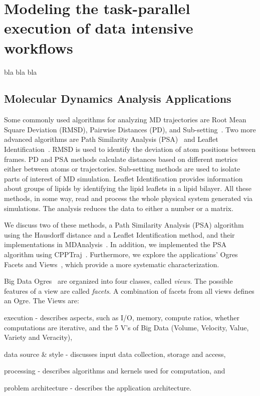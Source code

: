 \section{Modeling the task-parallel execution of data intensive workflows}
\label{task-par}
bla bla bla
\subsection{Molecular Dynamics Analysis Applications}
\label{use_cases}
Some commonly used algorithms for analyzing MD trajectories are Root Mean Square Deviation (RMSD), Pairwise Distances (PD), and Sub-setting~\cite{mura2014biomolecules}.
Two more advanced algorithms are Path Similarity Analysis (PSA)~\cite{seyler2015path} and Leaflet Identification~\cite{michaud2011mdanalysis}.
RMSD is used to identify the deviation of atom positions between frames.
PD and PSA methods calculate distances based on different metrics either between atoms or trajectories.
Sub-setting methods are used to isolate parts of interest of MD simulation.
Leaflet Identification provides information about groups of lipids by identifying the lipid leaflets in a lipid bilayer.
All these methods, in some way, read and process the whole physical system generated via simulations.
The analysis reduces the data to either a number or a matrix.

We discuss two of these methods, a Path Similarity Analysis (PSA) algorithm using the Hausdorff distance and a Leaflet Identification method, and their implementations in MDAnalysis~\cite{michaud2011mdanalysis,gowers2016mdanalysis}.
In addition, we implemented the PSA algorithm using CPPTraj~\cite{roe2013ptraj}.
Furthermore, we explore the applications' Ogres Facets and Views~\cite{fox2014towards}, which provide a more systematic characterization.

Big Data Ogres~\cite{fox2014towards} are organized into four classes, called \emph{views}. 
The possible features of a view are called \emph{facets}.
A combination of facets from all views defines an Ogre.
The Views are: 
\begin{inparaenum}[1)]
    \item execution - describes aspects, such as I/O, memory, compute ratios, whether computations are iterative, and the 5 V's of Big Data (Volume, Velocity, Value, Variety and Veracity),
    \item data source \& style - discusses input data collection, storage and access,
    \item processing - describes algorithms and kernels used for computation, and
    \item problem architecture - describes the application architecture.
\end{inparaenum}


